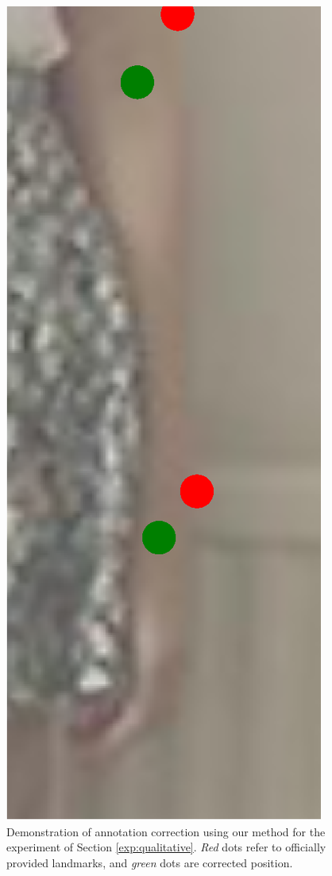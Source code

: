 \begin{figure}[!t]
    \hfill
    \includegraphics[height=\fh]{resources/Fixing/fix_18}
    \caption{Demonstration of annotation correction using our method for the experiment of Section \ref{exp:qualitative}. \emph{Red} dots refer to officially provided landmarks, and \emph{green} dots are corrected position.}
    \label{fig:qualitative}
\end{figure}

